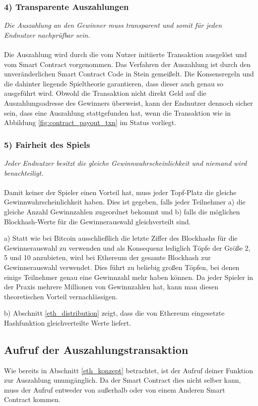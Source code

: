 \subsubsection{4) Transparente Auszahlungen}
\textit{Die Auszahlung an den Gewinner muss transparent und somit für jeden Endnutzer nachprüfbar sein.}\\\\
Die Auszahlung wird durch die vom Nutzer initiierte  Transaktion ausgelöst und vom Smart Contract vorgenommen. Das Verfahren der Auszahlung ist durch den unveränderlichen Smart Contract Code in Stein gemeißelt. Die Konsensregeln und die dahinter liegende Spieltheorie garantieren, dass dieser auch genau so ausgeführt wird. Obwohl die  Transaktion nicht direkt Geld auf die Auszahlungsadresse des Gewinners überweist, kann der Endnutzer dennoch sicher sein, dass eine Auszahlung stattgefunden hat, wenn die  Transaktion wie in Abbildung \ref{fig:contract_payout_txn} im Status  vorliegt.
\subsubsection{5) Fairheit des Spiels}
\textit{Jeder Endnutzer besitzt die gleiche Gewinnwahrscheinlichkeit und niemand wird benachteiligt.}\\\\
Damit keiner der Spieler einen Vorteil hat, muss jeder Topf-Platz die gleiche Gewinnwahrscheinlichkeit haben.
Dies ist gegeben, falls jeder Teilnehmer a) die gleiche Anzahl Gewinnzahlen zugeordnet bekommt und b) falls die möglichen Blockhash-Werte für die Gewinnerauswahl gleichverteilt sind.

a) Statt wie bei Bitcoin ausschließlich die letzte Ziffer des Blockhashs für die Gewinnerauswahl zu verwenden und als Konsequenz lediglich Töpfe der Größe 2, 5 und 10 anzubieten, wird bei Ethereum der gesamte Blockhash zur Gewinnerauswahl verwendet. Dies führt zu beliebig großen Töpfen, bei denen einige Teilnehmer genau eine Gewinnzahl mehr haben können. Da jeder Spieler in der Praxis mehrere Millionen von Gewinnzahlen hat, kann man diesen theoretischen Vorteil vernachlässigen.

b) Abschnitt \ref{eth_distribution} zeigt, dass die von Ethereum eingesetzte  Hashfunktion gleichverteilte Werte liefert.


\subsection{Aufruf der Auszahlungstransaktion}
Wie bereits in Abschnitt \ref{eth_konzept} betrachtet, ist der Aufruf deiner Funktion zur Auszahlung unumgänglich. Da der Smart Contract dies nicht selber kann, muss der Aufruf entweder von außerhalb oder von einem Anderen Smart Contract kommen.

